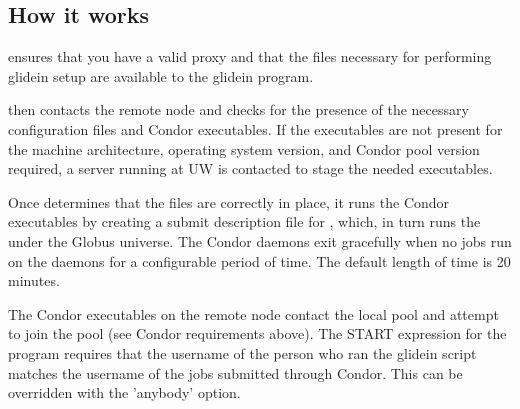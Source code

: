\subsection{How it works}
 ensures that you have a valid proxy and that the files
necessary for performing glidein setup are available to the glidein
program. 

 then contacts the remote node and checks for the
presence of the necessary configuration files and Condor executables.
If the executables are not present for the machine architecture, 
operating system version, and Condor pool version required, a 
server running at UW is contacted to stage the needed executables.

Once  determines that the files are correctly in place,
it runs the Condor executables by creating a submit description file for 
, which, in turn runs the  under the Globus 
universe.
The Condor daemons exit gracefully when no jobs run on the daemons for a 
configurable period of time. The default length of time is 20 minutes.

The Condor executables on the remote node contact the local pool and
attempt to join the pool (see Condor requirements above). The START
expression for the  program requires that the username
of the person who ran the glidein script matches the username of the jobs 
submitted through Condor. This can be overridden with the 'anybody' option.

